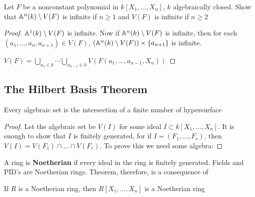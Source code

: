 \documentclass[11pt]{article}
\begin{document}
\begin{exercise}
\label{ex1.14}
Let \(F\) be a nonconstant polynomial in \(k[X_1,\dots,X_n]\), \(k\) algebraically closed. Show
that \(\mathbb{A}^n(k)\setminus V(F)\) is infinite if \(n\ge 1\) and \(V(F)\) is infinite if \(n\ge 2\)
\end{exercise}

\begin{proof}
\(\mathbb{A}^1(k)\setminus V(F)\) is infinite. Now if \(\mathbb{A}^n(k)\setminus V(F)\) is infinite, then for
each \((a_1,\dots,a_n,a_{n+1})\in V(F)\), \((\mathbb{A}^n(k)\setminus V(F))\times\{a_{n+1}\}\) is infinite.

\(V(F)=\bigcup_{a_1\in k}\cdots\bigcup_{a_{n-1}\in k}V(F(a_1,\dots,a_{n-1},X_n))\)
\end{proof}
\subsection{The Hilbert Basis Theorem}
\label{sec:orga638798}
\begin{theorem}[]
Every algebraic set is the intersection of a finite number of hypersurface
\end{theorem}

\begin{proof}
Let the algebraic set be \(V(I)\) for some ideal \(I\subset k[X_1,\dots,X_n]\). It is enough to show
that \(I\) is finitely generated, for if \(I=(F_1,\dots,F_r)\), then \(V(I)=V(F_1)\cap\dots\cap V(F_r)\). To prove
this we need some algebra:
\end{proof}

A ring is \textbf{Noetherian} if every ideal in the ring is finitely generated. Fields and PID's are
Noetherian rings. Theorem, therefore, is a consequence of

\begin{theorem}
If \(R\) is a Noetherian ring, then \(R[X_1,\dots,X_n]\) is a Noetherian ring
\end{theorem}
\end{document}
